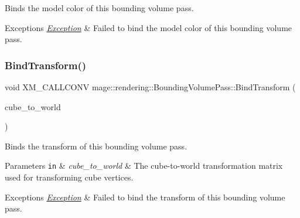 Binds the model color of this bounding volume pass.


\begin{DoxyExceptions}{Exceptions}
{\em \mbox{\hyperlink{classmage_1_1_exception}{Exception}}} & Failed to bind the model color of this bounding volume pass. \\
\hline
\end{DoxyExceptions}
\mbox{\label{classmage_1_1rendering_1_1_bounding_volume_pass_aa43435b88597d4d9a59047f4558c4bab}} 
\subsubsection{\texorpdfstring{Bind\+Transform()}{BindTransform()}}
{\footnotesize\ttfamily void X\+M\+\_\+\+C\+A\+L\+L\+C\+O\+NV mage\+::rendering\+::\+Bounding\+Volume\+Pass\+::\+Bind\+Transform (\begin{DoxyParamCaption}\item[{F\+X\+M\+M\+A\+T\+R\+IX}]{cube\+\_\+to\+\_\+world }\end{DoxyParamCaption})\hspace{0.3cm}{\ttfamily [private]}}

Binds the transform of this bounding volume pass.


\begin{DoxyParams}[1]{Parameters}
\mbox{\tt in}  & {\em cube\+\_\+to\+\_\+world} & The cube-\/to-\/world transformation matrix used for transforming cube vertices. \\
\hline
\end{DoxyParams}

\begin{DoxyExceptions}{Exceptions}
{\em \mbox{\hyperlink{classmage_1_1_exception}{Exception}}} & Failed to bind the transform of this bounding volume pass. \\
\hline
\end{DoxyExceptions}
\mbox{\label{classmage_1_1rendering_1_1_bounding_volume_pass_af6651287f16a21d755c8e304f4997fcf}} 
